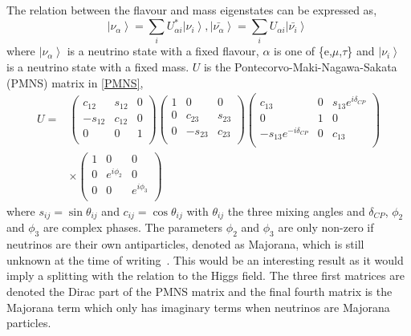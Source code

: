 The relation between the flavour and mass eigenstates can be expressed as,
\begin{equation}
\label{eq:eigenstates}
 \left| \nu_\alpha \right\rangle = \sum_{i} U^{*}_{\alpha i} \left| \nu_i \right\rangle,
 \left| \bar{\nu_\alpha} \right\rangle = \sum_{i} U_{\alpha i} \left| \bar{\nu_i} \right\rangle\
 \end{equation}
where
 $\left| \nu_\alpha \right\rangle $ is a neutrino state with a fixed flavour, $\alpha$ is one of \{e,$\mu$,$\tau$\} and  $\left| \nu_i \right\rangle$ is a neutrino state with a fixed mass.
$U$ is the Pontecorvo-Maki-Nagawa-Sakata (PMNS) matrix in \eqref{PMNS},
\begin{equation}
\label{PMNS}
\begin{aligned}
U ={} & 
 \begin{pmatrix}
 c_{12} & s_{12} & 0\\
  -s_{12} & c_{12} & 0\\
  0 & 0 & 1\\
 \end{pmatrix} 
  \begin{pmatrix}
 1 & 0 & 0\\
  0 & c_{23} & s_{23}\\
  0 & -s_{23} & c_{23}\\
 \end{pmatrix} 
   \begin{pmatrix}
 c_{13} & 0 & s_{13}e^{i\delta_{CP}}\\
  0 & 1 & 0\\
  -s_{13}e^{-i\delta_{CP}} & 0 & c_{13}\\
 \end{pmatrix} 
 \\
 & \times
  \begin{pmatrix}
1 & 0& 0\\
  0 & e^{i\phi_2} & 0\\
  0 & 0 & e^{i\phi_3}\\
 \end{pmatrix} 
 \end{aligned}
\end{equation}
where $s_{ij} = \sin\theta_{ij}$ and $c_{ij} = \cos\theta_{ij}$ with $\theta_{ij}$ the three mixing angles and $\delta_{CP}$, $\phi_2$ and $\phi_3$ are complex phases. The parameters $\phi_2$ and $\phi_3$ are only non-zero if neutrinos are their own antiparticles, denoted as Majorana, which is still unknown at the time of writing~\cite{13PDG}. This would be an interesting result as it would imply a splitting with the relation to the Higgs field. The three first matrices are denoted the Dirac part of the PMNS matrix and the final fourth matrix is the Majorana term which only has imaginary terms when neutrinos are Majorana particles.

